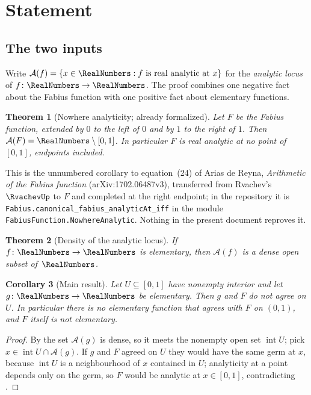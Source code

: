 \documentclass[11pt,oneside]{article}
\newtheorem{theorem}{Theorem}[section]
\newtheorem{corollary}[theorem]{Corollary}
\theoremstyle{definition}
\theoremstyle{remark}
\newcommand{\An}{\mathcal A}
\begin{document}
\tableofcontents

\section{Statement}

\subsection{The two inputs}

Write $\An(f)=\{x\in\RealNumbers : f \text{ is real analytic at } x\}$ for the
\emph{analytic locus} of $f\colon\RealNumbers\to\RealNumbers$.  The proof combines one negative
fact about the Fabius function with one positive fact about elementary
functions.

\begin{theorem}[Nowhere analyticity; already formalized]\label{thm:nowhere}
Let $F$ be the Fabius function, extended by $0$ to the left of $0$ and by $1$
to the right of $1$.  Then $\An(F)=\RealNumbers\setminus[0,1]$.  In particular $F$ is
real analytic at no point of $[0,1]$, endpoints included.
\end{theorem}

This is the unnumbered corollary to equation~(24) of Arias de Reyna,
\emph{Arithmetic of the Fabius function} (arXiv:1702.06487v3), transferred
from Rvachev's $\RvachevUp$ to $F$ and completed at the right endpoint; in the
repository it is \texttt{Fabius.canonical\_fabius\_analyticAt\_iff} in the
module \texttt{FabiusFunction.NowhereAnalytic}.  Nothing in the present
document reproves it.

\begin{theorem}[Density of the analytic locus]\label{thm:density}
If $f\colon\RealNumbers\to\RealNumbers$ is elementary, then $\An(f)$ is a dense open subset
of~$\RealNumbers$.
\end{theorem}

\begin{corollary}[Main result]\label{cor:main}
Let $U\subseteq[0,1]$ have nonempty interior and let $g\colon\RealNumbers\to\RealNumbers$ be
elementary.  Then $g$ and $F$ do not agree on $U$.  In particular there is no
elementary function that agrees with $F$ on $(0,1)$, and $F$ itself is not
elementary.
\end{corollary}

\begin{proof}
By  the set $\An(g)$ is dense, so it meets the nonempty open
set $\operatorname{int}U$; pick $x\in\operatorname{int}U\cap\An(g)$.  If $g$
and $F$ agreed on $U$ they would have the same germ at $x$, because
$\operatorname{int}U$ is a neighbourhood of $x$ contained in $U$; analyticity
at a point depends only on the germ, so $F$ would be analytic at $x\in[0,1]$,
contradicting .
\end{proof}
\end{document}
